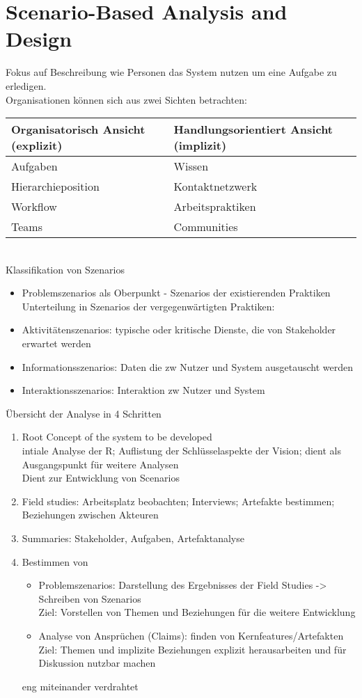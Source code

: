 \section{Scenario-Based Analysis and Design}
Fokus auf Beschreibung wie Personen das System nutzen um eine Aufgabe zu erledigen.\\
Organisationen können sich aus zwei Sichten betrachten:
\begin{table}[h]
	\centering
	\begin{tabular}{|p{20em}|p{20em}|}
		\hline
		\textbf{Organisatorisch Ansicht (explizit)} & \textbf{Handlungsorientiert Ansicht (implizit)}\\
		\hline
		Aufgaben & Wissen\\
		Hierarchieposition	& Kontaktnetzwerk\\
		Workflow 	& Arbeitspraktiken\\
		Teams	& Communities\\
		\hline
	\end{tabular}
\end{table}\\
Klassifikation von Szenarios
\begin{itemize}
	\item Problemszenarios als Oberpunkt - Szenarios der existierenden Praktiken\\
	 Unterteilung in Szenarios der vergegenwärtigten Praktiken:
	\item Aktivitätenszenarios: typische oder kritische Dienste, die von Stakeholder erwartet werden
	\item Informationsszenarios: Daten die zw Nutzer und System ausgetauscht werden
	\item Interaktionsszenarios: Interaktion zw Nutzer und System
\end{itemize}


Übersicht der Analyse in 4 Schritten
\begin{enumerate}
	\item Root Concept of the system to be developed\\
	intiale Analyse der R; Auflistung der Schlüsselaspekte der Vision; dient als Ausgangspunkt für weitere Analysen\\
	Dient zur Entwicklung von Scenarios
	\item Field studies: Arbeitsplatz beobachten; Interviews; Artefakte bestimmen; Beziehungen zwischen Akteuren
	\item Summaries: Stakeholder, Aufgaben, Artefaktanalyse
	\item Bestimmen von
		\begin{itemize}
			\item Problemszenarios: Darstellung des Ergebnisses der Field Studies -> Schreiben von Szenarios\\
			Ziel: Vorstellen von Themen und Beziehungen für die weitere Entwicklung
			\item Analyse von Ansprüchen (Claims): finden von Kernfeatures/Artefakten\\
			Ziel: Themen und implizite Beziehungen explizit herausarbeiten und für Diskussion nutzbar machen
		\end{itemize}
	eng miteinander verdrahtet
\end{enumerate}

